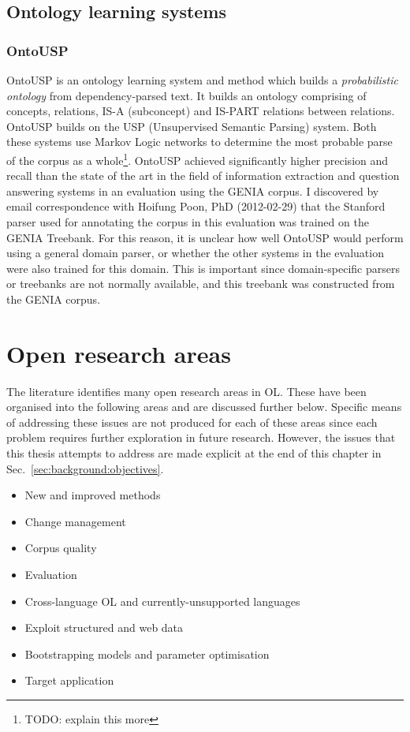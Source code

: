 \documentclass[a4paper]{report}
\newcommand{\todo}[1]{\footnote{{\color{red} TODO: #1}}}
\begin{document}
\subsection{Ontology learning systems}

\subsubsection{OntoUSP}

OntoUSP is an ontology learning system and method which builds a \emph{probabilistic ontology} from dependency-parsed text\cite{Poon2010OntoUSP}.
It builds an ontology comprising of concepts, relations, IS-A (subconcept) and IS-PART relations between relations.
OntoUSP builds on the USP (Unsupervised Semantic Parsing) system\cite{Poon09USP}.
Both these systems use Markov Logic networks to determine the most probable parse of the corpus as a whole\todo{explain this more}.
OntoUSP achieved significantly higher precision and recall than the state of the art in the field of information extraction and question answering systems in an evaluation using the GENIA\citep{KimEtAl03GeniaCorpus} corpus\cite{Poon2010OntoUSP}.
I discovered by email correspondence with Hoifung Poon, PhD (2012-02-29) that the Stanford parser\cite{Klein03PCFGParser} used for annotating the corpus in this evaluation was trained on the GENIA Treebank\cite{Tatseisi05GENIATB}.
For this reason, it is unclear how well OntoUSP would perform using a general domain parser, or whether the other systems in the evaluation were also trained for this domain.
This is important since domain-specific parsers or treebanks are not normally available, and this treebank was constructed from the GENIA corpus.

\section{Open research areas}
\label{sec:background:open-areas}

The literature identifies many open research areas in OL.
These have been organised into the following areas and are discussed further below. Specific means of addressing these issues are not produced for each of these areas since each problem requires further exploration in future research.
However, the issues that this thesis attempts to address are made explicit at the end of this chapter in Sec.~\ref{sec:background:objectives}.

\begin{itemize}
\item New and improved methods
\item Change management
\item Corpus quality
\item Evaluation
\item Cross-language OL and currently-unsupported languages
\item Exploit structured and web data
\item Bootstrapping models and parameter optimisation
\item Target application
\end{itemize}
\end{document}
